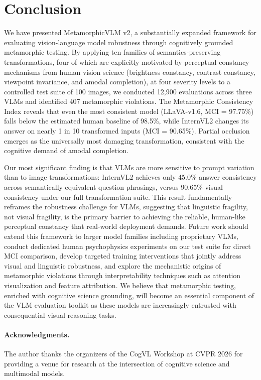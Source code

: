 \documentclass{cvpr}
\begin{document}
\section{Conclusion}
\label{sec:conclusion}

We have presented MetamorphicVLM v2, a substantially expanded framework for evaluating vision-language model robustness through cognitively grounded metamorphic testing. By applying ten families of semantics-preserving transformations, four of which are explicitly motivated by perceptual constancy mechanisms from human vision science (brightness constancy, contrast constancy, viewpoint invariance, and amodal completion), at four severity levels to a controlled test suite of 100 images, we conducted 12{,}900 evaluations across three VLMs and identified 407 metamorphic violations. The Metamorphic Consistency Index reveals that even the most consistent model (LLaVA-v1.6, MCI = 97.75\%) falls below the estimated human baseline of 98.5\%, while InternVL2 changes its answer on nearly 1 in 10 transformed inputs (MCI = 90.65\%). Partial occlusion emerges as the universally most damaging transformation, consistent with the cognitive demand of amodal completion.

Our most significant finding is that VLMs are more sensitive to prompt variation than to image transformations: InternVL2 achieves only 45.0\% answer consistency across semantically equivalent question phrasings, versus 90.65\% visual consistency under our full transformation suite. This result fundamentally reframes the robustness challenge for VLMs, suggesting that linguistic fragility, not visual fragility, is the primary barrier to achieving the reliable, human-like perceptual constancy that real-world deployment demands. Future work should extend this framework to larger model families including proprietary VLMs, conduct dedicated human psychophysics experiments on our test suite for direct MCI comparison, develop targeted training interventions that jointly address visual and linguistic robustness, and explore the mechanistic origins of metamorphic violations through interpretability techniques such as attention visualization and feature attribution. We believe that metamorphic testing, enriched with cognitive science grounding, will become an essential component of the VLM evaluation toolkit as these models are increasingly entrusted with consequential visual reasoning tasks.

{\small
\paragraph{Acknowledgments.}
The author thanks the organizers of the CogVL Workshop at CVPR 2026 for providing a venue for research at the intersection of cognitive science and multimodal models.
}

{\small


}
\end{document}
